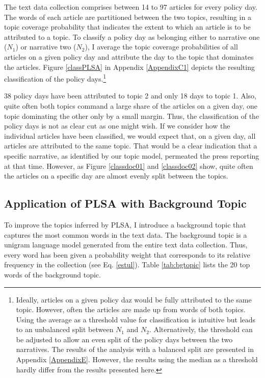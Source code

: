 \documentclass[11pt,a4paper,english,oneside]{book}
\numberwithin{equation}{chapter}
\begin{document}
The text data collection comprises between 14 to 97 articles for every policy day. The words of each article are partitioned between the two topics, resulting in a topic coverage probability that indicates the extent to which an article is to be attributed to a topic. To classify a policy day as belonging either to narrative one ($N_1$) or narrative two ($N_2$), I average the topic coverage probabilities of all articles on a given policy day and attribute the day to the topic that dominates the articles. Figure \ref{classPLSA} in Appendix \ref{AppendixC1} depicts the resulting classification of the policy days.\footnote{Ideally, articles on a given policy daz would be fully attributed to the same topic. However, often the articles are made up from words of both topics. Using the average as a threshold value for classification is intuitive but leads to an unbalanced split between $N_1$ and $N_2$. Alternatively, the threshold can be adjusted to allow an even split of the policy days between the two narratives. The results of the analysis with a balanced split are presented in Appendix \ref{AppendixE}. However, the results using the median as a threshold hardly differ from the results presented here.}

38 policy days have been attributed to topic 2 and only 18 days to topic 1. Also, quite often both topics command a large share of the articles on a given day, one topic dominating the other only by a small margin. Thus, the classification of the policy days is not as clear cut as one might wish. If we consider how the individual articles have been classified, we would expect that, on a given day, all articles are attributed to the same topic. That would be a clear indication that a specific narrative, as identified by our topic model, permeated the press reporting at that time. However, as Figure \ref{classdoc01} and \ref{classdoc02} show, quite often the articles on a specific day are almost evenly split between the topics.  

\subsection{Application of PLSA with Background Topic}\label{Ch:implembg}

To improve the topics inferred by PLSA, I introduce a background topic that captures the most common words in the text data. The background topic is a unigram language model generated from the entire text data collection. Thus, every word has been given a probability weight that corresponds to its relative frequency in the collection (see Eq. \ref{estul}). Table \ref{tab:bgtopic} lists the 20 top words of the background topic. 
\end{document}
